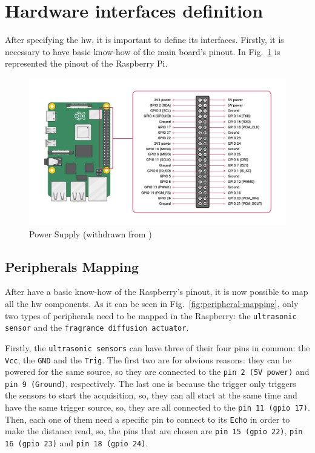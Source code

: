 \section{Hardware interfaces definition}
\label{sec:hw-interf-def}
After specifying the \gls{hw}, it is important to define its interfaces.
Firstly, it is necessary to have basic know-how of the main board's pinout.
In Fig.~\ref{fig:raspberry-pinout} is represented the pinout of the Raspberry Pi.
%
\begin{figure}[htb!]
\centering
    \includegraphics[width=0.9\columnwidth]{./img/raspberry-pinout.png}
  \caption{Power Supply (withdrawn from \cite{raspberry-pinout})}%
\label{fig:raspberry-pinout}
\end{figure}

\subsection{Peripherals Mapping}
\label{sec:periph-map}
After have a basic know-how of the Raspberry's pinout, it is now possible to map all the \gls{hw} components.
As it can be seen in Fig.~\ref{fig:peripheral-mapping}, only two types of peripherals need to be mapped in the Raspberry: the \texttt{ultrasonic sensor} and the \texttt{fragrance diffusion actuator}.

Firstly, the \texttt{ultrasonic sensors} can have three of their four pins in common: the \texttt{Vcc}, the \texttt{GND} and the \texttt{Trig}. The first two are for obvious reasons: they can be powered for the same source, so they are connected to the \texttt{pin 2 (5V power)} and \texttt{pin 9 (Ground)}, respectively. The last one is because the trigger only triggers the sensors to start the acquisition, so, they can all start at the same time and have the same trigger source, so, they are all connected to the \texttt{pin 11 (\gls{gpio} 17)}. Then, each one of them need a specific pin to connect to its \texttt{Echo} in order to make the distance read, so, the pins that are chosen are \texttt{pin 15 (\gls{gpio} 22)}, \texttt{pin 16 (\gls{gpio} 23)} and \texttt{pin 18 (\gls{gpio} 24)}.

